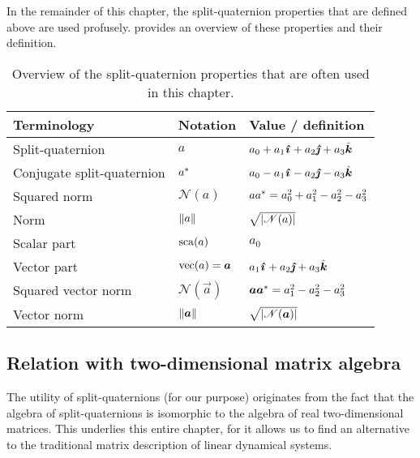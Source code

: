 In the remainder of this chapter, the split-quaternion properties that are defined above are used profusely.  provides an overview of these properties and their definition. 

\renewcommand{\arraystretch}{1.2}
\begin{table}[ht]
    \centering
    \caption{Overview of the split-quaternion properties that are often used in this chapter.}
    \label{tab:spquat_properties}
    \begin{tabular}{lll}
        \toprule
        \textbf{Terminology} & \textbf{Notation} & \textbf{Value / definition} \\
        \midrule
        Split-quaternion & \(a\) & \(a_0 + a_1\quati + a_2\quatj + a_3\quatk\) \\
        Conjugate split-quaternion & \(a^*\) & \(a_0 - a_1\quati - a_2\quatj - a_3\quatk\)\\
        \midrule
        Squared norm & \(\mathscr{N}(a)\) & \(aa^* = a_0^2 + a_1^2 - a_2^2 - a_3^2\) \\
        Norm & \(\norm{a}\) & \(\sqrt{\abs{\mathscr{N}(a)}}\) \\
        \midrule
        Scalar part & \(\mathrm{sca}\qty(a)\) & \(a_0\) \\
        Vector part & \(\vecpart{a} = \vec{a}\) & \(a_1\quati + a_2\quatj + a_3\quatk\) \\
        \midrule
        Squared vector norm & \(\mathscr{N}(\vec{a})\) & \( \vec{a}\conj{\vec{a}} = a_1^2 - a_2^2 - a_3^2 \) \\
        Vector norm & \(\norm{\vec{a}}\) & \(\sqrt{\abs{\mathscr{N}(\vec{a})}}\) \\
        \bottomrule
    \end{tabular}
\end{table}
\renewcommand{\arraystretch}{1}
 
\subsection{Relation with two-dimensional matrix algebra}
\label{ssec:quat_isomorphism}
The utility of split-quaternions (for our purpose) originates from the fact that the algebra of split-quaternions is isomorphic to the algebra of real two-dimensional matrices. This underlies this entire chapter, for it allows us to find an alternative to the traditional matrix description of linear dynamical systems. 


